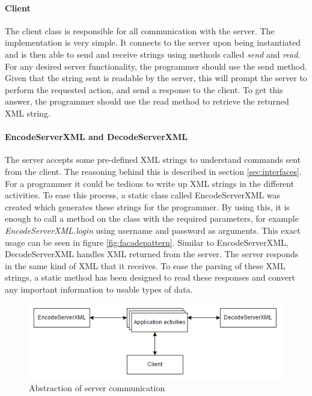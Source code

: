 \paragraph{Client}
The client class is responsible for all communication with the server. The implementation is very simple. It connects to the server upon being instantiated and is then able to send and receive strings using methods called \textit{send} and \textit{read}. For any desired server functionality, the programmer should use the send method. Given that the string sent is readable by the server, this will prompt the server to perform the requested action, and send a response to the client. To get this answer, the programmer should use the read method to retrieve the returned XML string.

\paragraph{EncodeServerXML and DecodeServerXML}
The server accepts some pre-defined XML strings to understand commands sent from the client. The reasoning behind this is described in section \ref{sec:interfaces}. For a programmer it could be tedious to write up XML strings in the different activities. To ease this process, a static class called EncodeServerXML was created which generates these strings for the programmer. By using this, it is enough to call a method on the class with the required parameters, for example \textit{EncodeServerXML.login} using username and password as arguments. This exact usage can be seen in figure \ref{fig:facadepattern}. Similar to EncodeServerXML, DecodeServerXML handles XML returned from the server. The server responds in the same kind of XML that it receives. To ease the parsing of these XML strings, a static method has been designed to read these responses and convert any important information to usable types of data.

\begin{figure}[H]
\centering
\includegraphics[width=\textwidth]{billeder/appcommunication.png}
\caption{Abstraction of server communication}
\label{fig:appcommunication}
\end{figure}